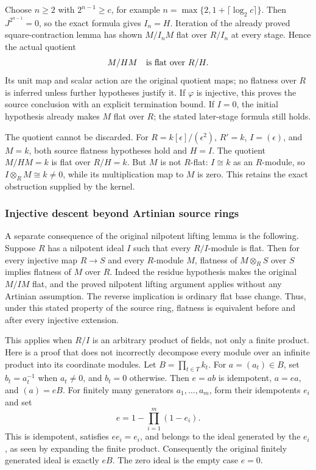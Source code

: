 Choose \(n\geq2\) with \(2^{n-1}\geq c\), for example \(n=\max\{2,1+\lceil\log_2c\rceil\}\). Then \(J^{2^{n-1}}=0\), so the exact formula gives \(I_n=H\). Iteration of the already proved square-contraction lemma has shown \(M/I_nM\) flat over \(R/I_n\) at every stage. Hence the actual quotient \[
M/HM\quad\hbox{is flat over }R/H.
\] Its unit map and scalar action are the original quotient maps; no flatness over \(R\) is inferred unless further hypotheses justify it. If \(\varphi\) is injective, this proves the source conclusion with an explicit termination bound. If \(I=0\), the initial hypothesis already makes \(M\) flat over \(R\); the stated later-stage formula still holds.

The quotient cannot be discarded. For \(R=k[\epsilon]/(\epsilon^2)\), \(R'=k\), \(I=(\epsilon)\), and \(M=k\), both source flatness hypotheses hold and \(H=I\). The quotient \(M/HM=k\) is flat over \(R/H=k\). But \(M\) is not \(R\)-flat: \(I\cong k\) as an \(R\)-module, so \(I\otimes_RM\cong k\ne0\), while its multiplication map to \(M\) is zero. This retains the exact obstruction supplied by the kernel.

\subsubsection{Injective descent beyond Artinian source rings}\label{algebra-proof-017-injective-descent-beyond-artinian-source-rings}

A separate consequence of the original nilpotent lifting lemma is the following. Suppose \(R\) has a nilpotent ideal \(I\) such that every \(R/I\)-module is flat. Then for every injective map \(R\to S\) and every \(R\)-module \(M\), flatness of \(M\otimes_RS\) over \(S\) implies flatness of \(M\) over \(R\). Indeed the residue hypothesis makes the original \(M/IM\) flat, and the proved nilpotent lifting argument applies without any Artinian assumption. The reverse implication is ordinary flat base change. Thus, under this stated property of the source ring, flatness is equivalent before and after every injective extension.

This applies when \(R/I\) is an arbitrary product of fields, not only a finite product. Here is a proof that does not incorrectly decompose every module over an infinite product into its coordinate modules. Let \(B=\prod_{t\in T}k_t\). For \(a=(a_t)\in B\), set \(b_t=a_t^{-1}\) when \(a_t\ne0\), and \(b_t=0\) otherwise. Then \(e=ab\) is idempotent, \(a=ea\), and \((a)=eB\). For finitely many generators \(a_1,\ldots,a_m\), form their idempotents \(e_i\) and set \[
e=1-\prod_{i=1}^m(1-e_i).
\] This is idempotent, satisfies \(ee_i=e_i\), and belongs to the ideal generated by the \(e_i\), as seen by expanding the finite product. Consequently the original finitely generated ideal is exactly \(eB\). The zero ideal is the empty case \(e=0\).

